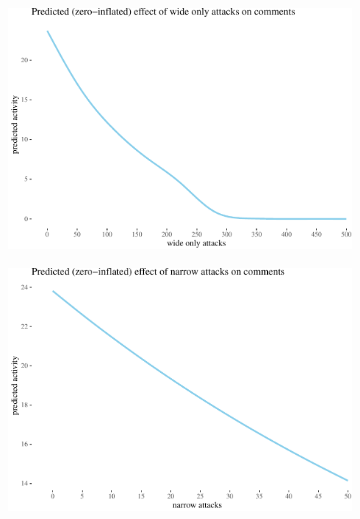 \documentclass[10pt,]{scrartcl}
\begin{document}
\begin{figure}
\begin{subfigure}[b]{0.45\textwidth}

\begin{center}\includegraphics[width=1\linewidth]{redditAnalysisWalkthrough_files/figure-latex/unnamed-chunk-103-1} \end{center}
\end{subfigure}
\hfill
\begin{subfigure}[b]{0.45\textwidth}

\begin{center}\includegraphics[width=1\linewidth]{redditAnalysisWalkthrough_files/figure-latex/unnamed-chunk-104-1} \end{center}
\end{subfigure}


\end{figure}
\end{document}
